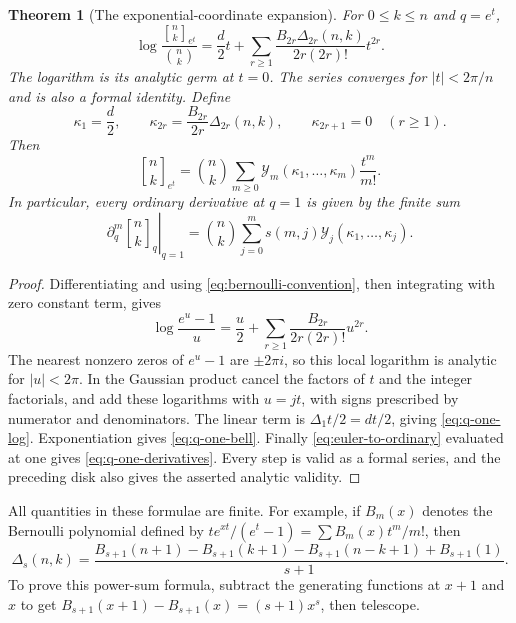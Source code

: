 \documentclass[11pt,a4paper]{article}
\numberwithin{equation}{section}
\newtheorem{theorem}{Theorem}[section]
\theoremstyle{definition}
\theoremstyle{remark}
\newcommand{\G}[2]{\genfrac{[}{]}{0pt}{}{#1}{#2}_{q}}
\newcommand{\Gb}[3]{\genfrac{[}{]}{0pt}{}{#1}{#2}_{#3}}
\newcommand{\Y}{\mathcal Y}
\begin{document}
\begin{theorem}[The exponential-coordinate expansion]
For $0\le k\le n$ and $q=e^t$,
\begin{equation}
 \log\frac{\Gb nk{e^t}}{\binom nk}
   =\frac d2t+
     \sum_{r\ge1}\frac{B_{2r}\Delta_{2r}(n,k)}{2r(2r)!}t^{2r}.
 \label{eq:q-one-log}
\end{equation}
The logarithm is its analytic germ at $t=0$. The series converges for
$|t|<2\pi/n$ and is also a formal identity. Define
\begin{equation}
 \kappa_1=\frac d2,\qquad
 \kappa_{2r}=\frac{B_{2r}}{2r}\Delta_{2r}(n,k),\qquad
 \kappa_{2r+1}=0\quad(r\ge1).
 \label{eq:gaussian-cumulants}
\end{equation}
Then
\begin{equation}
 \Gb nk{e^t}=
   \binom nk\sum_{m\ge0}\Y_m(\kappa_1,\ldots,\kappa_m)
                          \frac{t^m}{m!}.
 \label{eq:q-one-bell}
\end{equation}
In particular, every ordinary derivative at $q=1$ is given by the
finite sum
\begin{equation}
 \boxed{\displaystyle
 \left.\partial_q^m\G nk\right|_{q=1}
    =\binom nk\sum_{j=0}^m s(m,j)
                       \Y_j(\kappa_1,\ldots,\kappa_j).}
 \label{eq:q-one-derivatives}
\end{equation}
\end{theorem}
\begin{proof}
Differentiating and using \cref{eq:bernoulli-convention}, then
integrating with zero constant term, gives
\[
 \log\frac{e^u-1}{u}
    =\frac u2+\sum_{r\ge1}\frac{B_{2r}}{2r(2r)!}u^{2r}.
\]
The nearest nonzero zeros of $e^u-1$ are $\pm2\pi i$, so this local
logarithm is analytic for $|u|<2\pi$. In the Gaussian product cancel
the factors of $t$ and the integer factorials, and add these logarithms
with $u=jt$, with signs prescribed by numerator and denominators.
The linear term is $\Delta_1t/2=dt/2$, giving
\cref{eq:q-one-log}. Exponentiation gives \cref{eq:q-one-bell}.
Finally \cref{eq:euler-to-ordinary} evaluated at one gives
\cref{eq:q-one-derivatives}. Every step is valid as a formal series,
and the preceding disk also gives the asserted analytic validity.
\end{proof}

All quantities in these formulae are finite. For example, if $B_m(x)$
denotes the Bernoulli polynomial defined by
$te^{xt}/(e^t-1)=\sum B_m(x)t^m/m!$, then
\begin{equation}
 \Delta_s(n,k)=
 \frac{B_{s+1}(n+1)-B_{s+1}(k+1)-B_{s+1}(n-k+1)+B_{s+1}(1)}{s+1}.
 \label{eq:delta-faulhaber}
\end{equation}
To prove this power-sum formula, subtract the generating functions at
$x+1$ and $x$ to get
$B_{s+1}(x+1)-B_{s+1}(x)=(s+1)x^s$, then telescope.
\end{document}
